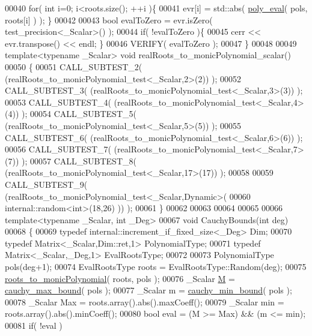 \begin{DoxyCode}
00040   \textcolor{keywordflow}{for}( \textcolor{keywordtype}{int} i=0; i<roots.size(); ++i )\{
00041     evr[i] = std::abs( \hyperlink{namespace_eigen_adb64ffddaa9e83634e3ab0e3fd3664f5}{poly\_eval}( pols, roots[i] ) ); \}
00042 
00043   \textcolor{keywordtype}{bool} evalToZero = evr.isZero( test\_precision<\_Scalar>() );
00044   \textcolor{keywordflow}{if}( !evalToZero )\{
00045     cerr << evr.transpose() << endl; \}
00046   VERIFY( evalToZero );
00047 \}
00048 
00049 \textcolor{keyword}{template}<\textcolor{keyword}{typename} \_Scalar> \textcolor{keywordtype}{void} realRoots\_to\_monicPolynomial\_scalar()
00050 \{
00051   CALL\_SUBTEST\_2( (realRoots\_to\_monicPolynomial\_test<\_Scalar,2>(2)) );
00052   CALL\_SUBTEST\_3( (realRoots\_to\_monicPolynomial\_test<\_Scalar,3>(3)) );
00053   CALL\_SUBTEST\_4( (realRoots\_to\_monicPolynomial\_test<\_Scalar,4>(4)) );
00054   CALL\_SUBTEST\_5( (realRoots\_to\_monicPolynomial\_test<\_Scalar,5>(5)) );
00055   CALL\_SUBTEST\_6( (realRoots\_to\_monicPolynomial\_test<\_Scalar,6>(6)) );
00056   CALL\_SUBTEST\_7( (realRoots\_to\_monicPolynomial\_test<\_Scalar,7>(7)) );
00057   CALL\_SUBTEST\_8( (realRoots\_to\_monicPolynomial\_test<\_Scalar,17>(17)) );
00058 
00059   CALL\_SUBTEST\_9( (realRoots\_to\_monicPolynomial\_test<\_Scalar,Dynamic>(
00060           internal::random<int>(18,26) )) );
00061 \}
00062 
00063 
00064 
00065 
00066 \textcolor{keyword}{template}<\textcolor{keyword}{typename} \_Scalar, \textcolor{keywordtype}{int} \_Deg>
00067 \textcolor{keywordtype}{void} CauchyBounds(\textcolor{keywordtype}{int} deg)
00068 \{
00069   \textcolor{keyword}{typedef} internal::increment\_if\_fixed\_size<\_Deg>            Dim;
00070   \textcolor{keyword}{typedef} Matrix<\_Scalar,Dim::ret,1>                  PolynomialType;
00071   \textcolor{keyword}{typedef} Matrix<\_Scalar,\_Deg,1>                      EvalRootsType;
00072 
00073   PolynomialType pols(deg+1);
00074   EvalRootsType roots = EvalRootsType::Random(deg);
00075   \hyperlink{namespace_eigen_afbc3648f7ef67db3d5d04454fc1257fd}{roots\_to\_monicPolynomial}( roots, pols );
00076   \_Scalar \hyperlink{group___core___module_class_eigen_1_1_matrix}{M} = \hyperlink{namespace_eigen_ac90ec4513aa09bb8ad54daa209322d03}{cauchy\_max\_bound}( pols );
00077   \_Scalar m = \hyperlink{namespace_eigen_a43f0af310d5cc131eb5e806f241af951}{cauchy\_min\_bound}( pols );
00078   \_Scalar Max = roots.array().abs().maxCoeff();
00079   \_Scalar min = roots.array().abs().minCoeff();
00080   \textcolor{keywordtype}{bool} eval = (M >= Max) && (m <= min);
00081   \textcolor{keywordflow}{if}( !eval )

\end{DoxyCode}

